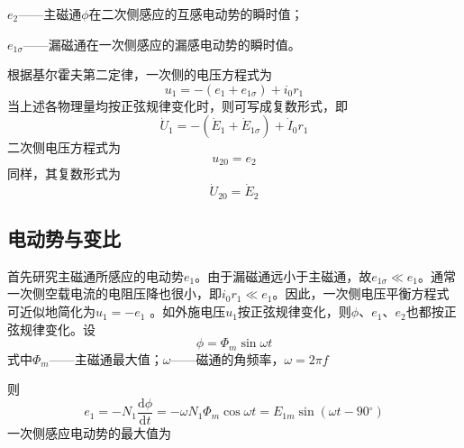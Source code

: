 \documentclass{book}
\begin{document}
${{e}_{2}}$——主磁通$\phi$在二次侧感应的互感电动势的瞬时值；

${{e}_{1\sigma }}$——漏磁通在一次侧感应的漏感电动势的瞬时值。

根据基尔霍夫第二定律，一次侧的电压方程式为
\begin{equation}
{{u}_{1}}=-\left( {{e}_{1}}+{{e}_{1\sigma }} \right)+{{i}_{0}}{{r}_{1}}
\label{2-1}
\end{equation}
当上述各物理量均按正弦规律变化时，则可写成复数形式，即
\begin{equation}
{{\dot{U}}_{1}}=-\left( {{{\dot{E}}}_{1}}+{{{\dot{E}}}_{1\sigma }} \right)+{{\dot{I}}_{0}}{{r}_{1}}
\label{2-2}
\end{equation}
二次侧电压方程式为
\begin{equation}
{{u}_{20}}={{e}_{2}}
\label{2-3}
\end{equation}
同样，其复数形式为
\begin{equation}
{{{\dot{U}}_{20}}={{\dot{E}}_{2}}}
\label{2-4}
\end{equation}

\subsection{电动势与变比}
首先研究主磁通所感应的电动势${{e}_{1}}$。由于漏磁通远小于主磁通，故${{e}_{1\sigma }}\ll {{e}_{1}}$。通常一次侧空载电流的电阻压降也很小，即${{i}_{0}}{{r}_{1}}\ll {{e}_{1}}$。因此，一次侧电压平衡方程式可近似地简化为${{u}_{1}}=-{{e}_{1}}$ 。如外施电压${{u}_{1}}$按正弦规律变化，则$\phi $、${{e}_{1}}$、${{e}_{2}}$也都按正弦规律变化。设
\[\phi ={{\Phi }_{m}}\sin \omega t\]
式中${{\Phi }_{m}}$——主磁通最大值；$\omega $——磁通的角频率，$\omega =2\pi f$

则
\begin{equation}
{{e}_{1}}=-{{N}_{1}}\frac{\text{d}\phi }{\text{d}t}=-\omega {{N}_{1}}{{\Phi }_{m}}\cos \omega t={{E}_{1m}}\sin \left( \omega t-90{}^\circ  \right)
\label{2-5}
\end{equation}
一次侧感应电动势的最大值为
\end{document}
